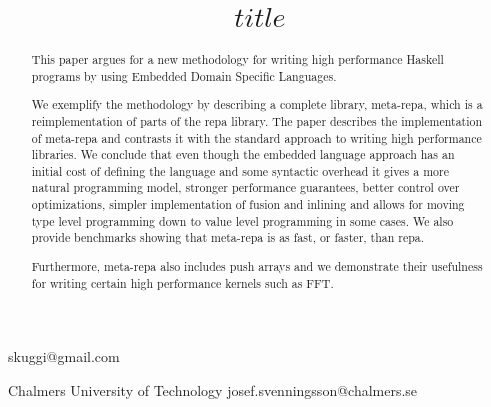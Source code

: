 \documentclass{sigplanconf}
\begin{document}
\setlength{\pdfpageheight}{\paperheight}
\setlength{\pdfpagewidth}{\paperwidth}

\exclusivelicense
{} 


\title{$title$}


           {}
           {skuggi@gmail.com}

           {Chalmers University of Technology}
           {josef.svenningsson@chalmers.se}

\maketitle

\begin{abstract}
This paper argues for a new methodology for writing high performance
Haskell programs by using Embedded Domain Specific Languages. 

We exemplify the methodology by describing a complete library,
meta-repa, which is a reimplementation of parts of the repa
library. The paper describes the implementation of meta-repa and
contrasts it with the standard approach to writing high performance
libraries. We conclude that even though the embedded language approach
has an initial cost of defining the language and some syntactic
overhead it gives a more natural programming model, stronger
performance guarantees, better control over optimizations, simpler
implementation of fusion and inlining and allows for moving type level
programming down to value level programming in some cases. We also
provide benchmarks showing that meta-repa is as fast, or faster, than
repa.

Furthermore, meta-repa also includes push arrays and we demonstrate
their usefulness for writing certain high performance kernels such as
FFT.
\end{abstract}

\end{document}

